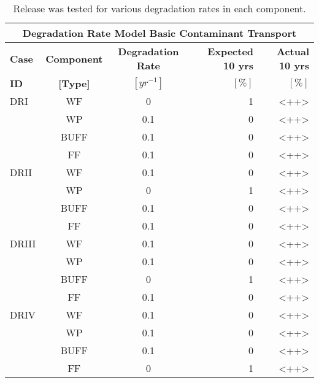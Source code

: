 \begin{table}
\centering
\begin{tabular}{|l|c|c|r|r|}
  \hline
  \multicolumn{5}{c}{\textbf{Degradation Rate Model Basic Contaminant Transport}}\\
  \hline
  \textbf{Case}  &  \textbf{Component} &  \textbf{Degradation Rate} & \textbf{Expected 10 yrs} & \textbf{Actual 10 yrs}\\
  \textbf{ID}    & \textbf{[Type]} &  \textbf{$[yr^{-1}]$}  &  $[\%]$  & $[\%]$\\
  \hline
  DRI     &  WF    &  0   & 1 & <++> \\ 
          &  WP    &  0.1 & 0 & <++> \\ 
          &  BUFF  &  0.1 & 0 & <++> \\ 
          &  FF    &  0.1 & 0 & <++> \\ 
  \hline
  DRII    &  WF    &  0.1 & 0 & <++> \\ 
          &  WP    &  0   & 1 & <++> \\ 
          &  BUFF  &  0.1 & 0 & <++> \\ 
          &  FF    &  0.1 & 0 & <++> \\ 
  \hline
  DRIII   &  WF    &  0.1 & 0 & <++> \\ 
          &  WP    &  0.1 & 0 & <++> \\ 
          &  BUFF  &  0   & 1 & <++> \\ 
          &  FF    &  0.1 & 0 & <++> \\ 
  \hline
  DRIV    &  WF    &  0.1 & 0 & <++> \\ 
          &  WP    &  0.1 & 0 & <++> \\ 
          &  BUFF  &  0.1 & 0 & <++> \\ 
          &  FF    &  0   & 1 & <++> \\ 
  \hline
\end{tabular}
\caption[Degradation rate model clay basic transport problem results.]{Release was 
tested for various degradation rates in each component.}
\label{tab:dr_no_release}
\end{table}
